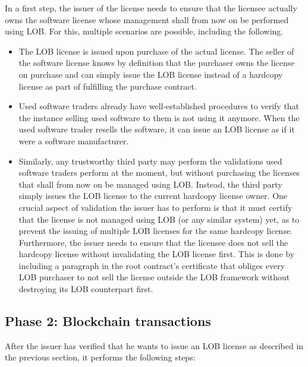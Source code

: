 \documentclass[a4paper]{article}
\begin{document}
In a first step, the issuer of the license needs to ensure that the licensee actually owns the software license whose management shall from now on be performed using LOB. For this, multiple scenarios are possible, including the following.
\begin{itemize}
  \item The LOB license is issued upon purchase of the actual license. The seller of the software license knows by definition that the purchaser owns the license on purchase and can simply issue the LOB license instead of a hardcopy license as part of fulfilling the purchase contract.

  \item Used software traders already have well-established procedures to verify that the instance selling used software to them is not using it anymore. When the used software trader resells the software, it can issue an LOB license as if it were a software manufacturer.

  \item Similarly, any trustworthy third party may perform the validations used software traders perform at the moment, but without purchasing the licenses that shall from now on be managed using LOB. Instead, the third party simply issues the LOB license to the current hardcopy license owner. One crucial aspect of validation the issuer has to perform is that it must certify that the license is not managed using LOB (or any similar system) yet, as to prevent the issuing of multiple LOB licenses for the same hardcopy license. Furthermore, the issuer needs to ensure that the licensee does not sell the hardcopy license without invalidating the LOB license first. This is done by including a paragraph in the root contract's certificate that obliges every LOB purchaser to not sell the license outside the LOB framework without destroying its LOB counterpart first.
\end{itemize}

\subsection{Phase 2: Blockchain transactions}

After the issuer has verified that he wants to issue an LOB license as described in the previous section, it performs the following steps:
\end{document}
